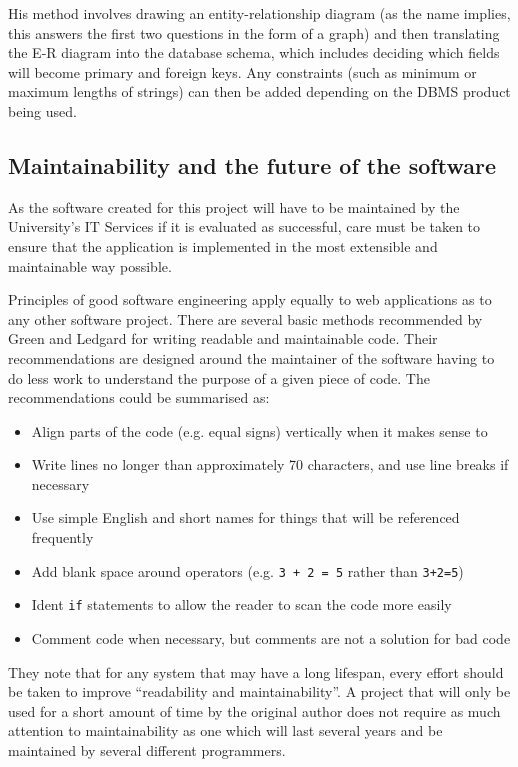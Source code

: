 \documentclass[]{scrartcl}
\begin{document}
His method involves drawing an entity-relationship diagram (as the name
implies, this answers the first two questions in the form of a graph) and then
translating the E-R diagram into the database schema, which includes deciding
which fields will become primary and foreign keys. Any constraints (such as
minimum or maximum lengths of strings) can then be added depending on the DBMS
product being used.

\subsection{Maintainability and the future of the software}

As the software created for this project will have to be maintained by the
University's IT Services if it is evaluated as successful, care must be taken
to ensure that the application is implemented in the most extensible and
maintainable way possible.

Principles of good software engineering apply equally to web applications as
to any other software project. There are several basic methods recommended by
Green and Ledgard \cite{Green:2011:CGF:2063166.2063168} for writing readable
and maintainable code. Their recommendations are designed around the
maintainer of the software having to do less work to understand the purpose of
a given piece of code. The recommendations could be summarised as:

\begin{itemize}
  \item Align parts of the code (e.g. equal signs) vertically when it makes sense to
  \item Write lines no longer than approximately 70 characters, and use line breaks if necessary
  \item Use simple English and short names for things that will be referenced frequently
  \item Add blank space around operators (e.g. \texttt{3 + 2 = 5} rather than \texttt{3+2=5})
  \item Ident \texttt{if} statements to allow the reader to scan the code more easily
  \item Comment code when necessary, but comments are not a solution for bad code
\end{itemize}

They note that for any system that may have a long lifespan, every effort
should be taken to improve ``readability and maintainability''. A project that
will only be used for a short amount of time by the original author does not
require as much attention to maintainability as one which will last several
years and be maintained by several different programmers.
\end{document}

